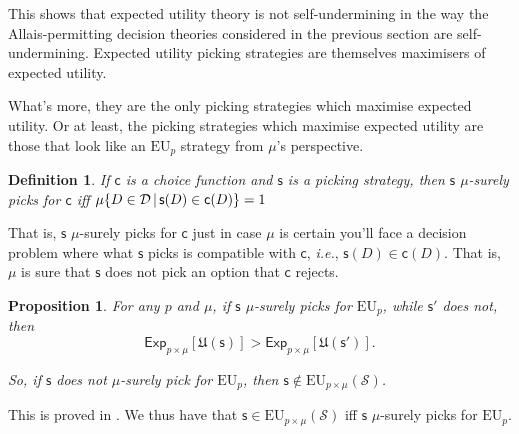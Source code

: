 \documentclass[a4paper]{article}
\newtheorem{definition}{Definition}
\newtheorem{proposition}[theorem]{Proposition}
\newcommand\Exp{\mathsf{Exp}}
\newcommand\EU{\mathrm{EU}}
\newcommand\U{\mathfrak{U}} %
\newcommand{\D}{\mathcal{D}}
\renewcommand\S{\mathcal{S}}
\newcommand\s{\mathsf{s}}
\renewcommand\c{\mathsf{c}} %
\newcommand{\Strategies}{\S}
\newcommand\SetDelimiter[1][]{
	\nonscript\,#1\vert \allowbreak \nonscript\,\mathopen{}}
\providecommand\given{\SetDelimiter}
\newenvironment{CCM rewritten}
{\begingroup\color{blue}} %
{\endgroup}              %
\begin{document}
This shows that expected utility theory is not self-undermining in the way the Allais-permitting decision theories considered in the previous section are self-undermining. Expected utility picking strategies are themselves maximisers of expected utility. 

What's more, they are the only picking strategies which maximise expected utility. Or at least, the picking strategies which maximise expected utility are those that look like an $\EU_p$ strategy from $\mu$'s perspective. %

\begin{definition}\label{def:mu surely picks for}
If $\c$ is a choice function and $\s$ is a picking strategy, then $\s$ \emph{$\mu$-surely picks for $\c$} iff $\mu\{D \in \D \given \s(D)\in \c(D)\}=1$
\end{definition}
{That is, $\s$ $\mu$-surely picks for $\c$ just in case $\mu$ is certain you'll face a decision problem where what $\s$ picks is compatible with $\c$, \emph{i.e.}, $\s(D)\in\c(D)$. That is, $\mu$ is sure that $\s$ does not pick an option that $\c$ rejects. }

\begin{proposition}\label{thm:eu-uniquely-optimal}
	For any $p$ and $\mu$, if $\s$ $\mu$-surely picks for $\EU_p$, while $\s'$ does not, then $$\Exp_{p\times\mu}[\U(\s)] > \Exp_{p\times\mu}[\U(\s')].$$
	
	So, if $\s$ does not $\mu$-surely pick for $\EU_p$, then $\s\notin\EU_{p\times\mu}(\Strategies)$. 
\end{proposition}

This is proved in . We thus have that $\s \in \EU_{p\times \mu}(\Strategies)$ iff $\s$ $\mu$-surely picks for $\EU_p$. 
\end{document}
